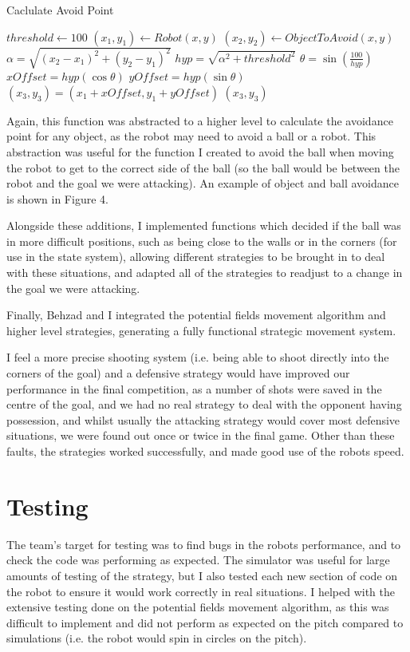 \documentclass[12pt]{IEEEtran}
\begin{document}
\begin{algorithm}
\caption{Caclulate Avoid Point}
\begin{algorithmic}[1]
\STATE $threshold \gets 100$
\STATE $(x_{1}, y_{1}) \gets Robot (x, y)$
\STATE $(x_{2}, y_{2}) \gets Object To Avoid (x, y)$
\STATE $\alpha = \sqrt{(x_{2} - x_{1})^{2} + (y_{2} - y_{1})^{2}}$
\STATE $hyp = \sqrt{\alpha^{2} + threshold^{2}}$
\STATE $\theta = \sin(\frac{100}{hyp})$
\STATE $xOffset = hyp(\cos\theta)$
\STATE $yOffset = hyp(\sin\theta)$
\STATE $(x_{3}, y_{3}) = (x_{1} + xOffset, y_{1} + yOffset)$
\RETURN $(x_{3}, y_{3})$
\end{algorithmic}
\end{algorithm}

Again, this function was abstracted to a higher level to calculate the avoidance point for any object, as the robot may need to avoid a ball or a robot. This abstraction was useful for the function I created to avoid the ball when moving the robot to get to the correct side of the ball (so the ball would be between the robot and the goal we were attacking). An example of object and ball avoidance is shown in Figure 4. \linebreak

Alongside these additions, I implemented functions which decided if the ball was in more difficult positions, such as being close to the walls or in the corners (for use in the state system), allowing different strategies to be brought in to deal with these situations, and adapted all of the strategies to readjust to a change in the goal we were attacking.

Finally, Behzad and I integrated the potential fields movement algorithm and higher level strategies, generating a fully functional strategic movement system.

I feel a more precise shooting system (i.e. being able to shoot directly into the corners of the goal) and a defensive strategy would have improved our performance in the final competition, as a number of shots were saved in the centre of the goal, and we had no real strategy to deal with the opponent having possession, and whilst usually the attacking strategy would cover most defensive situations, we were found out once or twice in the final game. Other than these faults, the strategies worked successfully, and made good use of the robots speed.

\section{Testing}
The team's target for testing was to find bugs in the robots performance, and to check the code was performing as expected. The simulator was useful for large amounts of testing of the strategy, but I also tested each new section of code on the robot to ensure it would work correctly in real situations. I helped with the extensive testing done on the potential fields movement algorithm, as this was difficult to implement and did not perform as expected on the pitch compared to simulations (i.e. the robot would spin in circles on the pitch). 
\end{document}
